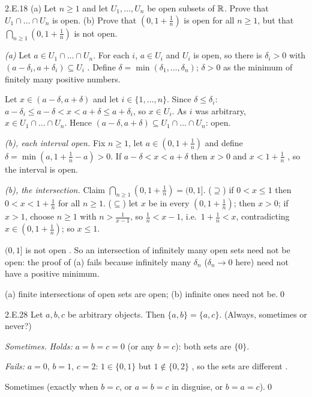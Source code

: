 \begin{bookex}[bonus]{2.E.18}
(a) Let $n\ge1$ and let $U_1,\dots,U_n$ be open subsets of $\mathbb{R}$. Prove that $U_1\cap\dots\cap U_n$ is open. (b) Prove that $(0,1+\frac1n)$ is open for all $n\ge1$, but that $\bigcap_{n\ge1}(0,1+\frac1n)$ is not open.
\solution
\begin{steps}
\item \emph{(a)} Let $a\in U_1\cap\dots\cap U_n$. For each $i$, $a\in U_i$ and $U_i$ is open, so there is $\delta_i>0$ with $(a-\delta_i,a+\delta_i)\subseteq U_i$ . Define $\delta=\min(\delta_1,\dots,\delta_n)$; $\delta>0$ as the minimum of finitely many positive numbers.
\item Let $x\in(a-\delta,a+\delta)$ and let $i\in\{1,\dots,n\}$. Since $\delta\le\delta_i$: $a-\delta_i\le a-\delta<x<a+\delta\le a+\delta_i$, so $x\in U_i$. As $i$ was arbitrary, $x\in U_1\cap\dots\cap U_n$. Hence $(a-\delta,a+\delta)\subseteq U_1\cap\dots\cap U_n$: open.
\item \emph{(b), each interval open.} Fix $n\ge1$, let $a\in(0,1+\frac1n)$ and define $\delta=\min(a,1+\frac1n-a)>0$. If $a-\delta<x<a+\delta$ then $x>0$ and $x<1+\frac1n$ , so the interval is open.
\item \emph{(b), the intersection.} Claim $\bigcap_{n\ge1}(0,1+\frac1n)=(0,1]$. ($\supseteq$) if $0<x\le1$ then $0<x<1+\frac1n$ for all $n\ge1$. ($\subseteq$) let $x$ be in every $(0,1+\frac1n)$; then $x>0$; if $x>1$, choose $n\ge1$ with $n>\frac1{x-1}$, so $\frac1n<x-1$, i.e.\ $1+\frac1n<x$, contradicting $x\in(0,1+\frac1n)$; so $x\le1$.
\item $(0,1]$ is not open . So an intersection of infinitely many open sets need not be open: the proof of (a) fails because infinitely many $\delta_n$ ($\delta_n\to0$ here) need not have a positive minimum.
\end{steps}
\conclusion (a) finite intersections of open sets are open; (b) infinite ones need not be.\qed
\end{bookex}

\begin{bookex}[recommended]{2.E.28}
Let $a,b,c$ be arbitrary objects. Then $\{a,b\}=\{a,c\}$. (Always, sometimes or never?)
\solution
\begin{steps}
\item \emph{Sometimes.} \emph{Holds:} $a=b=c=0$ (or any $b=c$): both sets are $\{0\}$.
\item \emph{Fails:} $a=0$, $b=1$, $c=2$: $1\in\{0,1\}$ but $1\notin\{0,2\}$ , so the sets are different .
\end{steps}
\conclusion Sometimes (exactly when $b=c$, or $a=b=c$ in disguise, or $b=a=c$).\qed
\end{bookex}

